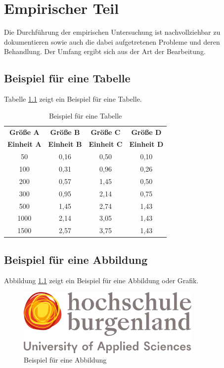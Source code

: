 \chapter{Empirischer Teil} \label{cha:empiricalPart}
Die Durchführung der empirischen Untersuchung ist nachvollziehbar zu dokumentieren sowie auch die dabei aufgetretenen Probleme und deren Behandlung. Der Umfang ergibt sich aus der Art der Bearbeitung.

\section{Beispiel für eine Tabelle}

Tabelle \ref{tab:example} zeigt ein Beispiel für eine Tabelle.

\begin{table}[h]
    \centering
    \renewcommand{\arraystretch}{1.2}
    \begin{tabular}{|c|c|c|c|}
        \hline
        \textbf{Größe A} & \textbf{Größe B} & \textbf{Größe C} & \textbf{Größe D} \\
        \textbf{Einheit A} & \textbf{Einheit B} & \textbf{Einheit C} & \textbf{Einheit D} \\
        \hline
        50  & 0,16 & 0,50 & 0,10 \\
        100 & 0,31 & 0,96 & 0,26 \\
        200 & 0,57 & 1,45 & 0,50 \\
        300 & 0,95 & 2,14 & 0,75 \\
        500 & 1,45 & 2,74 & 1,43 \\
        1000 & 2,14 & 3,05 & 1,43 \\
        1500 & 2,57 & 3,75 & 1,43 \\
        \hline
    \end{tabular}
    \caption{Beispiel für eine Tabelle}
    \label{tab:example}
\end{table}

\section{Beispiel für eine Abbildung}

Abbildung \ref{fig:example} zeigt ein Beispiel für eine Abbildung oder Grafik.

\begin{figure}[h]
    \centering
    \includegraphics[width=0.8\textwidth]{figures/Hochschule-Burgenland-Logo.jpg} 
    \caption{Beispiel für eine Abbildung}
    \label{fig:example}
\end{figure}

